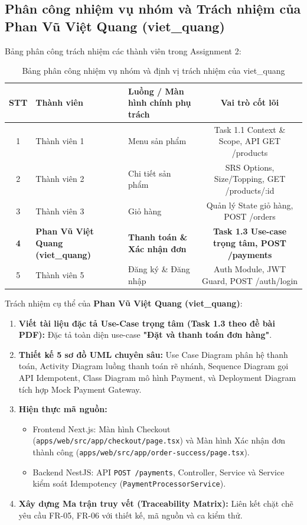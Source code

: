 \documentclass[a4paper]{article}
\begin{document}
\subsection{Phân công nhiệm vụ nhóm và Trách nhiệm của Phan Vũ Việt Quang (viet\_quang)}
Bảng phân công trách nhiệm các thành viên trong Assignment 2:
\begin{table}[h!]
\centering
\small
\begin{tabular}{|c|l|l|c|}
\hline
\textbf{STT} & \textbf{Thành viên} & \textbf{Luồng / Màn hình chính phụ trách} & \textbf{Vai trò cốt lõi} \\ \hline
1 & Thành viên 1 & Menu sản phẩm & Task 1.1 Context \& Scope, API GET /products \\ \hline
2 & Thành viên 2 & Chi tiết sản phẩm & SRS Options, Size/Topping, GET /products/:id \\ \hline
3 & Thành viên 3 & Giỏ hàng & Quản lý State giỏ hàng, POST /orders \\ \hline
\textbf{4} & \textbf{Phan Vũ Việt Quang (viet\_quang)} & \textbf{Thanh toán \& Xác nhận đơn} & \textbf{Task 1.3 Use-case trọng tâm, POST /payments} \\ \hline
5 & Thành viên 5 & Đăng ký \& Đăng nhập & Auth Module, JWT Guard, POST /auth/login \\ \hline
\end{tabular}
\caption{Bảng phân công nhiệm vụ nhóm và định vị trách nhiệm của viet\_quang}
\end{table}

Trách nhiệm cụ thể của \textbf{Phan Vũ Việt Quang (viet\_quang)}:
\begin{enumerate}
    \item \textbf{Viết tài liệu đặc tả Use-Case trọng tâm (Task 1.3 theo đề bài PDF):} Đặc tả toàn diện use-case \textbf{"Đặt và thanh toán đơn hàng"}.
    \item \textbf{Thiết kế 5 sơ đồ UML chuyên sâu:} Use Case Diagram phân hệ thanh toán, Activity Diagram luồng thanh toán rẽ nhánh, Sequence Diagram gọi API Idempotent, Class Diagram mô hình Payment, và Deployment Diagram tích hợp Mock Payment Gateway.
    \item \textbf{Hiện thực mã nguồn:}
    \begin{itemize}
        \item Frontend Next.js: Màn hình Checkout (\texttt{apps/web/src/app/checkout/page.tsx}) và Màn hình Xác nhận đơn thành công (\texttt{apps/web/src/app/order-success/page.tsx}).
        \item Backend NestJS: API \texttt{POST /payments}, Controller, Service và Service kiểm soát Idempotency (\texttt{PaymentProcessorService}).
    \end{itemize}
    \item \textbf{Xây dựng Ma trận truy vết (Traceability Matrix):} Liên kết chặt chẽ yêu cầu FR-05, FR-06 với thiết kế, mã nguồn và ca kiểm thử.
\end{enumerate}
\end{document}
